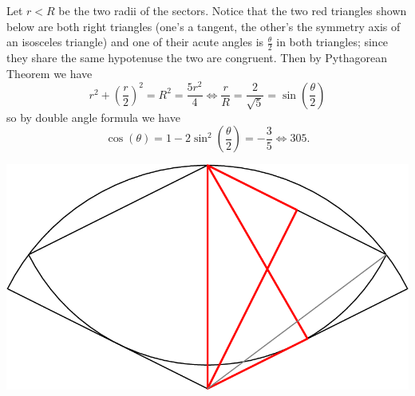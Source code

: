 \begin{solution}\hfil\medskip
	
    Let $r < R$ be the two radii of the sectors. Notice that the two red triangles shown below are both right triangles (one's a tangent, the other's the symmetry axis of an isosceles triangle)
    and one of their acute angles is $\frac{\theta}{2}$ in both triangles; since they share the same hypotenuse the two are congruent. Then by Pythagorean Theorem we have
    $$r^2 + \left(\dfrac{r}{2}\right)^2 = R^2 = \dfrac{5r^2}{4} \iff \dfrac{r}{R} = \dfrac{2}{\sqrt{5}} = \sin\left(\dfrac{\theta}{2}\right)$$
    so by double angle formula we have $$\cos(\theta) = 1 - 2 \sin^2\left(\dfrac{\theta}{2}\right) = -\dfrac{3}{5} \iff \boxed{305}.$$

    \begin{center}
        \includegraphics[scale=0.4]{Sections/Files/13-1-4S.png}
    \end{center}
\end{solution}\bigskip
